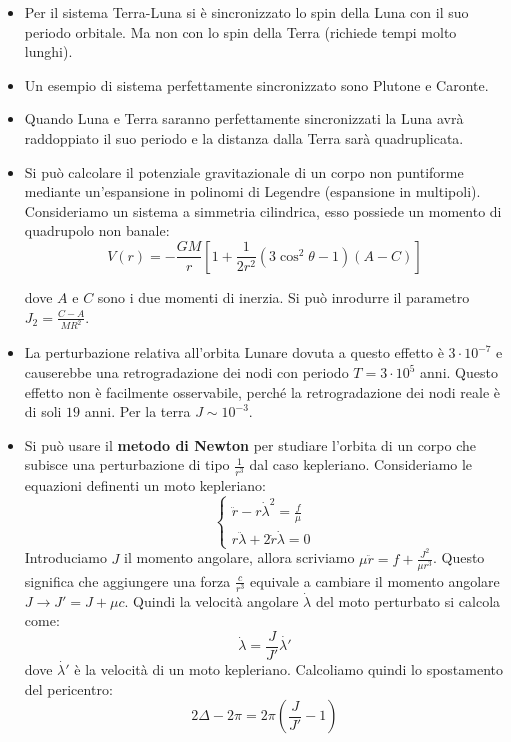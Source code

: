 \documentclass[11pt,a4paper]{article}
\begin{document}
\begin{itemize}
\item Per il sistema Terra-Luna si è sincronizzato lo spin della Luna con il suo periodo orbitale. Ma non con lo spin della Terra (richiede tempi molto lunghi).

\item Un esempio di sistema perfettamente sincronizzato sono Plutone e Caronte.

\item Quando Luna e Terra saranno perfettamente sincronizzati la Luna avrà raddoppiato il suo periodo e la distanza dalla Terra sarà quadruplicata.

\item Si può calcolare il potenziale gravitazionale di un corpo non puntiforme mediante un'espansione in polinomi di Legendre (espansione in multipoli). Consideriamo un sistema a simmetria cilindrica, esso possiede un momento di quadrupolo non banale:
\begin{equation}
V(r) = -\frac{GM}{r} \left[ 1 + \frac{1}{2 r^2} \left( 3 \cos^2 \theta - 1 \right) \left( A - C \right) \right]
\end{equation}

dove $A$ e $C$ sono i due momenti di inerzia. Si può inrodurre il parametro $J_2 = \frac{C-A}{M R^2}$.

\item La perturbazione relativa all'orbita Lunare dovuta a questo effetto è $3 \cdot 10^{-7}$ e causerebbe una retrogradazione dei nodi con periodo $T = 3 \cdot 10^5$ anni. Questo effetto non è facilmente osservabile, perché la retrogradazione dei nodi reale è di soli $19$ anni. Per la terra $J \sim 10^{-3}$.

\item Si può usare il \textbf{metodo di Newton} per studiare l'orbita di un corpo che subisce una perturbazione di tipo $\frac{1}{r^3}$ dal caso kepleriano. Consideriamo le equazioni definenti un moto kepleriano:
\begin{equation}
\begin{cases}
 \ddot{r} - r \dot{\lambda}^2 = \frac
{f}{\mu} \\
 r \ddot{\lambda} + 2 \dot{r} \dot{\lambda} = 0
\end{cases}
\end{equation} 
Introduciamo $J$ il momento angolare, allora scriviamo $\mu \ddot{r} = f + \frac{J^2}{\mu r^3}$. Questo significa che aggiungere una forza $\frac{c}{r^3}$ equivale a cambiare il momento angolare $J \rightarrow J' = J + \mu c$. Quindi la velocità angolare $\dot{\lambda}$ del moto perturbato si calcola come:
\begin{equation}
\dot{\lambda} = \frac{J}{J'} \dot{\lambda'}
\end{equation}
dove $\dot{\lambda'}$ è la velocità di un moto kepleriano. Calcoliamo quindi lo spostamento del pericentro:
\begin{equation}
2 \Delta - 2 \pi = 2 \pi \left( \frac{J}{J'} - 1 \right)
\end{equation}


\end{itemize}
\end{document}
